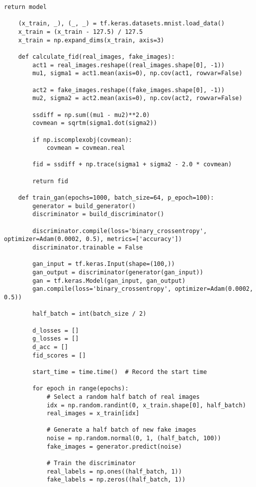 \begin{lstlisting}[style=mypython, caption= Explore GAN with more convolutional layers 1]
        return model
    
    (x_train, _), (_, _) = tf.keras.datasets.mnist.load_data()
    x_train = (x_train - 127.5) / 127.5
    x_train = np.expand_dims(x_train, axis=3)
    
    def calculate_fid(real_images, fake_images):
        act1 = real_images.reshape((real_images.shape[0], -1))
        mu1, sigma1 = act1.mean(axis=0), np.cov(act1, rowvar=False)
        
        act2 = fake_images.reshape((fake_images.shape[0], -1))
        mu2, sigma2 = act2.mean(axis=0), np.cov(act2, rowvar=False)
        
        ssdiff = np.sum((mu1 - mu2)**2.0)
        covmean = sqrtm(sigma1.dot(sigma2))
        
        if np.iscomplexobj(covmean):
            covmean = covmean.real
        
        fid = ssdiff + np.trace(sigma1 + sigma2 - 2.0 * covmean)
        
        return fid
    
    def train_gan(epochs=1000, batch_size=64, p_epoch=100):
        generator = build_generator()
        discriminator = build_discriminator()
    
        discriminator.compile(loss='binary_crossentropy', optimizer=Adam(0.0002, 0.5), metrics=['accuracy'])
        discriminator.trainable = False
    
        gan_input = tf.keras.Input(shape=(100,))
        gan_output = discriminator(generator(gan_input))
        gan = tf.keras.Model(gan_input, gan_output)
        gan.compile(loss='binary_crossentropy', optimizer=Adam(0.0002, 0.5))
    
        half_batch = int(batch_size / 2)
        
        d_losses = []
        g_losses = []
        d_acc = []
        fid_scores = []
        
        start_time = time.time()  # Record the start time
    
        for epoch in range(epochs):
            # Select a random half batch of real images
            idx = np.random.randint(0, x_train.shape[0], half_batch)
            real_images = x_train[idx]
    
            # Generate a half batch of new fake images
            noise = np.random.normal(0, 1, (half_batch, 100))
            fake_images = generator.predict(noise)
    
            # Train the discriminator
            real_labels = np.ones((half_batch, 1))
            fake_labels = np.zeros((half_batch, 1))
    

\end{lstlisting}
